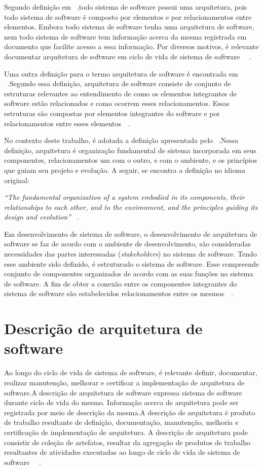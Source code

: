 Segundo definição em ~\cite{arq_01},todo sistema de software possui uma arquitetura, pois todo sistema de software é composto por elementos e por relacionamentos entre elementos. Embora todo sistema de software tenha uma arquitetura de software, nem todo sistema de software tem informação acerca da mesma registrada em documento que facilite acesso a essa informação. Por diversos motivos, é relevante documentar arquitetura de software em ciclo de vida de sistema de software ~\cite{arq_01}~\cite{Carnegie_textbook}.

Uma outra definição para o termo arquitetura de software é encontrada em ~\cite{arq_02}.Segundo essa definição, arquitetura de software consiste de conjunto de estruturas relevantes ao entendimento de como os elementos integrantes de software estão relacionados e como ocorrem esses relacionamentos. Essas estruturas são compostas por elementos integrantes do software e por relacionamentos entre esses elementos~\cite{Carnegie_textbook}~\cite{arq_02}.

No contexto deste trabalho, é adotada a definição apresentada pelo ~\cite{ISO_1471}.Nessa definição, arquitetura é organização fundamental de sistema incorporada em seus componentes, relacionamentos um com o outro, e com o ambiente, e os princípios que guiam seu projeto e evolução. A seguir, se encontra a definição no idioma original:


\emph{
“The fundamental organization of a system embodied in its components, their relationships to each other, and to the environment, and the principles guiding its design and evolution”
}~\cite{ISO_1471}.


Em desenvolvimento de sistema de software, o desenvolvimento de arquitetura de software se faz de acordo com o ambiente de desenvolvimento, são consideradas necessidades das partes interessadas (\emph{stakeholders}) no sistema de software. Tendo esse ambiente sido definido, é estruturado o sistema de software. Esse compreende conjunto de componentes organizados de acordo com as suas funções no sistema de software. A fim de obter a conexão entre os componentes integrantes do sistema de software são estabelecidos relacionamentos entre os mesmos~\cite{Carnegie_textbook}~\cite{ISO_1471}. 


\section{Descrição de arquitetura de software}

Ao longo do ciclo de vida de sistema de software, é relevante definir, documentar, realizar manutenção, melhorar e certificar a implementação de arquitetura de software.A descrição de arquitetura de software expressa sistema de software durante ciclo de vida do mesmo.
Informação acerca de arquitetura pode ser registrada por meio de descrição da mesma.A descrição de arquitetura é produto de trabalho resultante de definição, documentação, manutenção, melhoria e certificação de implementação de  arquitetura. A descrição de arquitetura pode consistir de coleção de artefatos, resultar da agregação de produtos de trabalho resultantes de atividades executadas ao longo de ciclo de vida de sistema de software  ~\cite{ISO_1471}~\cite{ISO_42010}. 

